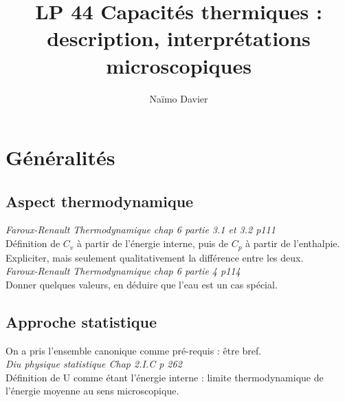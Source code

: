 \documentclass[12pt,prb,aps,epsf]{article}
\begin{document}
	
	\title{LP 44 Capacités thermiques : description, interprétations microscopiques}
	\author{Naïmo Davier}
	
	\maketitle
	
	\tableofcontents
	
	\pagebreak
	
\section{Généralités}
\subsection{Aspect thermodynamique}
\textit{Faroux-Renault Thermodynamique chap 6 partie 3.1 et 3.2 p111}\\
Définition de $C_v$ à partir de l'énergie interne, puis de $C_p$ à partir de l'enthalpie. Expliciter, mais seulement qualitativement la différence entre les deux.\\

\textit{Faroux-Renault Thermodynamique chap 6 partie 4 p114}\\
Donner quelques valeurs, en déduire que l'eau est un cas spécial.

\subsection{Approche statistique}
On a pris l'ensemble canonique comme pré-requis : être bref.\\

\textit{Diu physique statistique Chap 2.I.C p 262}\\
Définition de U comme étant l'énergie interne : limite thermodynamique de l'énergie moyenne au sens microscopique.\\
\end{document}
